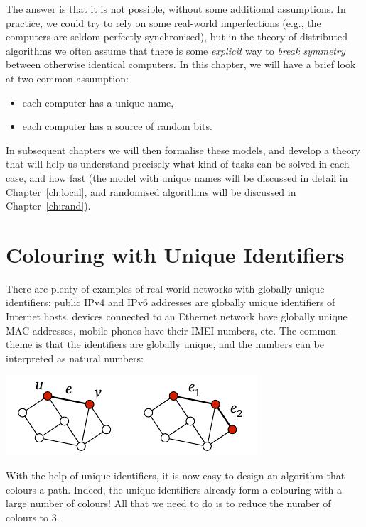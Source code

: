 The answer is that it is not possible, without some additional assumptions. In practice, we could try to rely on some real-world imperfections (e.g., the computers are seldom perfectly synchronised), but in the theory of distributed algorithms we often assume that there is some \emph{explicit} way to \emph{break symmetry} between otherwise identical computers. In this chapter, we will have a brief look at two common assumption:
\begin{itemize}[noitemsep]
    \item each computer has a unique name,
    \item each computer has a source of random bits.
\end{itemize}
In subsequent chapters we will then formalise these models, and develop a theory that will help us understand precisely what kind of tasks can be solved in each case, and how fast (the model with unique names will be discussed in detail in Chapter~\ref{ch:local}, and randomised algorithms will be discussed in Chapter~\ref{ch:rand}).


\section{Colouring with Unique Identifiers}\label{sec:algo-p3c}

There are plenty of examples of real-world networks with globally unique identifiers: public IPv4 and IPv6 addresses are globally unique identifiers of Internet hosts, devices connected to an Ethernet network have globally unique MAC addresses, mobile phones have their IMEI numbers, etc. The common theme is that the identifiers are globally unique, and the numbers can be interpreted as natural numbers:
\begin{center}
    \includegraphics[page=\PIntroId]{figs.pdf}
\end{center}
With the help of unique identifiers, it is now easy to design an algorithm that colours a path. Indeed, the unique identifiers already form a colouring with a large number of colours! All that we need to do is to reduce the number of colours to $3$.

